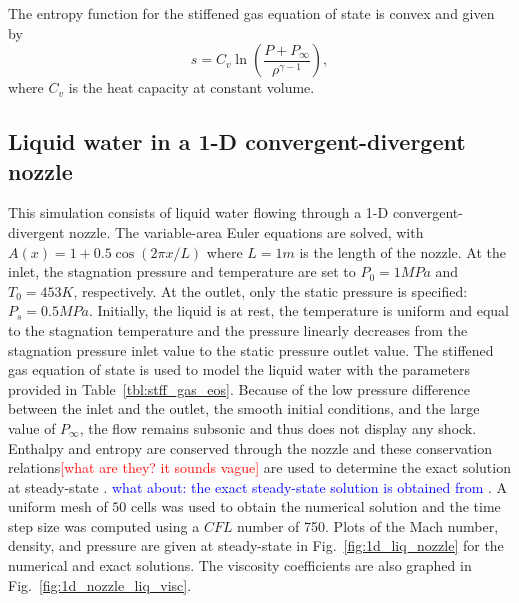 \documentclass[preprint,10pt]{elsarticle}
\newcommand{\fig}[1]{Fig.~\ref{#1}}                      %
\newcommand{\tbl}[1]{Table~\ref{#1}}                     %
\newcommand{\tcr}[1]{\textcolor{red}{#1}}
\newcommand{\tcb}[1]{\textcolor{blue}{#1}}
\begin{document}
The entropy function for the stiffened gas equation of state is convex and given by
%
\begin{equation*}
s = C_v \ln \left( \frac{P+P_\infty}{\rho^{\gamma-1}} \right) ,
\end{equation*}
where $C_v$ is the heat capacity at constant volume.

\subsection{Liquid water in a 1-D convergent-divergent nozzle} \label{sec:liquid_nozzle}

This simulation consists of liquid water flowing through a 1-D convergent-divergent nozzle. The variable-area Euler equations are solved, with $A(x) = 1 + 0.5 \cos(2 \pi x / L)$ where $L=1m$ is the length of the nozzle. At the inlet, the stagnation pressure and temperature are set to $P_0 = 1 MPa$ and $T_0 = 453 K$, respectively. At the outlet, only the static pressure is specified: $P_s = 0.5MPa$. 
Initially, the liquid is at rest, the temperature is uniform and equal to the stagnation temperature and the pressure linearly decreases from the stagnation pressure inlet value to the static pressure outlet value. 
The stiffened gas equation of state is used to model the liquid water with the parameters provided in \tbl{tbl:stff_gas_eos}.
Because of the low pressure difference between the inlet and the outlet, the smooth initial conditions, and the large value of $P_\infty$, the flow remains subsonic and thus does not display any shock. Enthalpy and entropy are conserved through the nozzle and these conservation relations\tcr{[what are they? it sounds vague]} are used to determine the exact solution at steady-state \cite{nozzle_exact}. \tcb{what about: the exact steady-state solution is obtained from \cite{nozzle_exact}}. A uniform mesh of $50$ cells was used to obtain the numerical solution and the time step size was computed using a $CFL$ number of 750.
Plots of the Mach number, density, and pressure are given at steady-state in \fig{fig:1d_liq_nozzle} for the numerical and exact solutions. The viscosity coefficients are also graphed in \fig{fig:1d_nozzle_liq_visc}. 
\end{document}
